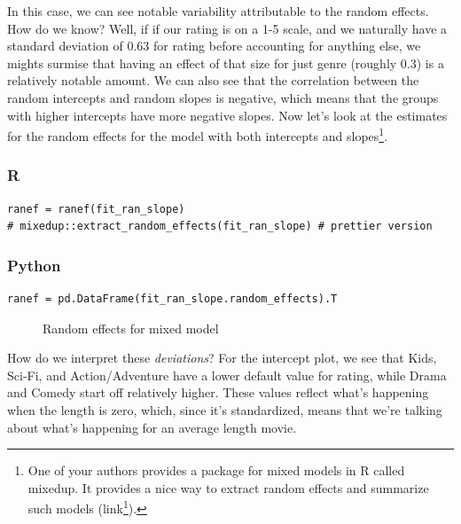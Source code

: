 \documentclass[
  letterpaper,
]{krantz}
\DeclareRobustCommand{\href}[2]{#2\footnote{\url{#1}}}
\begin{document}
In this case, we can see notable variability attributable to the random
effects. How do we know? Well, if if our rating is on a 1-5 scale, and
we naturally have a standard deviation of 0.63 for rating before
accounting for anything else, we mights surmise that having an effect of
that size for just genre (roughly 0.3) is a relatively notable amount.
We can also see that the correlation between the random intercepts and
random slopes is negative, which means that the groups with higher
intercepts have more negative slopes. Now let's look at the estimates
for the random effects for the model with both intercepts and
slopes\footnote{One of your authors provides a package for mixed models
  in R called {mixedup}. It provides a nice way to extract random
  effects and summarize such models
  (\href{https://github.com/m-clark/mixedup}{link}).}.

\subsubsection{R}

\begin{verbatim}
ranef = ranef(fit_ran_slope)
# mixedup::extract_random_effects(fit_ran_slope) # prettier version
\end{verbatim}

\subsubsection{Python}

\begin{verbatim}
ranef = pd.DataFrame(fit_ran_slope.random_effects).T
\end{verbatim}

\begin{figure}[H]


\caption{\label{fig-random-effects}Random effects for mixed model}

\end{figure}%

How do we interpret these \emph{deviations}? For the intercept plot, we
see that Kids, Sci-Fi, and Action/Adventure have a lower default value
for rating, while Drama and Comedy start off relatively higher. These
values reflect what's happening when the length is zero, which, since
it's standardized, means that we're talking about what's happening for
an average length movie.
\end{document}

